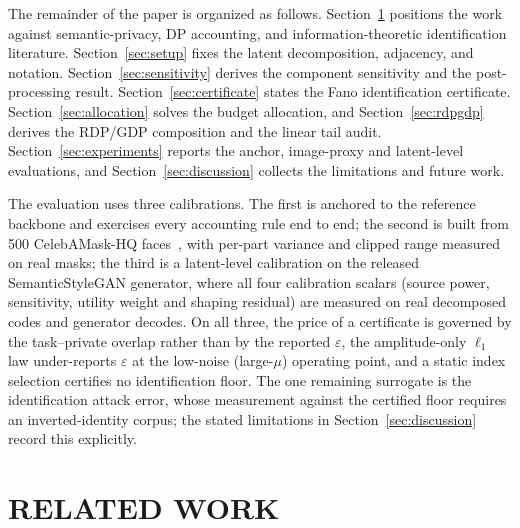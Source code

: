 \documentclass{ieeetj}
\theoremstyle{plain}
\theoremstyle{definition}
\begin{document}
The remainder of the paper is organized as follows.
Section~\ref{sec:related} positions the work against semantic-privacy, DP
accounting, and information-theoretic identification literature.
Section~\ref{sec:setup} fixes the latent decomposition, adjacency, and notation.
Section~\ref{sec:sensitivity} derives the component sensitivity and the
post-processing result. Section~\ref{sec:certificate} states the Fano
identification certificate. Section~\ref{sec:allocation} solves the budget
allocation, and Section~\ref{sec:rdpgdp} derives the RDP/GDP composition and the
linear tail audit. Section~\ref{sec:experiments} reports the anchor,
image-proxy and latent-level evaluations, and Section~\ref{sec:discussion}
collects the limitations and future work.

The evaluation uses three calibrations. The first is anchored to the reference
backbone and exercises every accounting rule end to end; the second is built
from 500 CelebAMask-HQ faces~\cite{celebamaskhq}, with per-part variance and
clipped range measured on real masks; the third is a latent-level calibration
on the released SemanticStyleGAN generator, where all four calibration
scalars (source power, sensitivity, utility weight and shaping residual) are
measured on real decomposed codes and generator decodes. On all three, the
price of a certificate is governed by the task--private overlap rather than by
the reported $\varepsilon$, the amplitude-only $\ell_1$ law under-reports
$\varepsilon$ at the low-noise (large-$\mu$) operating point, and a
static index selection certifies no identification floor. The one remaining
surrogate is the identification attack error, whose measurement against the
certified floor requires an inverted-identity corpus; the stated limitations in
Section~\ref{sec:discussion} record this explicitly.

\section{RELATED WORK}
\label{sec:related}
\end{document}
